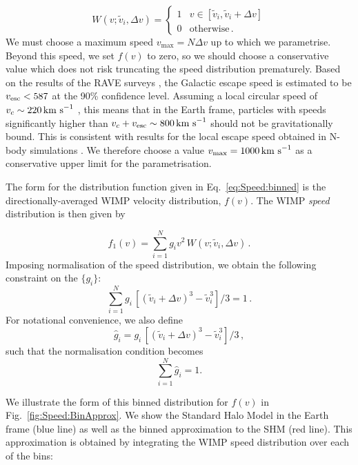 \begin{equation}
W(v;\tilde{v}_i,\Delta v) =
\begin{cases}
   1 &  v \in [\tilde{v}_i,\tilde{v}_i+\Delta v] \\
   0  & \text{otherwise}\,.
  \end{cases}
\end{equation}
We must choose a maximum speed $v_\textrm{max} = N\Delta v$ up to which we parametrise. Beyond this speed, we set $f(v)$ to zero, so we should choose a conservative value which does not risk truncating the speed distribution prematurely. Based on the results of the RAVE surveys \cite{RAVE:2007, RAVE:2014}, the Galactic escape speed is estimated to be $\vesc < 587$ at the 90\% confidence level. Assuming a local circular speed of $v_c \sim 220 \,\textrm{km s}^{-1}$ \cite{Kerr:1986,Feast:1997}, this means that in the Earth frame, particles with speeds significantly higher than $v_c + \vesc \sim 800 \kms$ should not be gravitationally bound. This is consistent with results for the local escape speed obtained in N-body simulations \cite{Kuhlen:2010}. We therefore choose a value $v_\textrm{max} = 1000 \,\textrm{km s}^{-1}$ as a conservative upper limit for the parametrisation.

The form for the distribution function given in Eq.~\ref{eq:Speed:binned} is the directionally-averaged WIMP velocity distribution, $f(v)$. The WIMP \textit{speed} distribution is then given by

\begin{equation}
\label{eq:Speed:binned2}
f_1(v) = \sum_{i = 1}^N g_i v^2\, W(v;\tilde{v}_i,\Delta v) \,.
\end{equation}
Imposing normalisation of the speed distribution, we obtain the following constraint on the \(\{g_i\}\):
\begin{equation}
\label{eq:Speed:Normg}
\sum_{i = 1}^N g_i \, \left[(\tilde{v}_i + \Delta v)^3 - \tilde{v}_i^3\right]/3 = 1 \,.
\end{equation}
For notational convenience, we also define
\begin{equation}
\hat{g}_i = g_i \, \left[(\tilde{v}_i + \Delta v)^3 - \tilde{v}_i^3\right]/3 \,,
\end{equation}
such that the normalisation condition becomes
\begin{equation}
\label{eq:Speed:ghat}
\sum_{i = 1}^N \hat{g}_i = 1.
\end{equation}

We illustrate the form of this binned distribution for $f(v)$ in Fig.~\ref{fig:Speed:BinApprox}. We show the Standard Halo Model in the Earth frame (blue line) as well as the binned approximation to the SHM (red line). This approximation is obtained by integrating the WIMP speed distribution over each of the bins:


